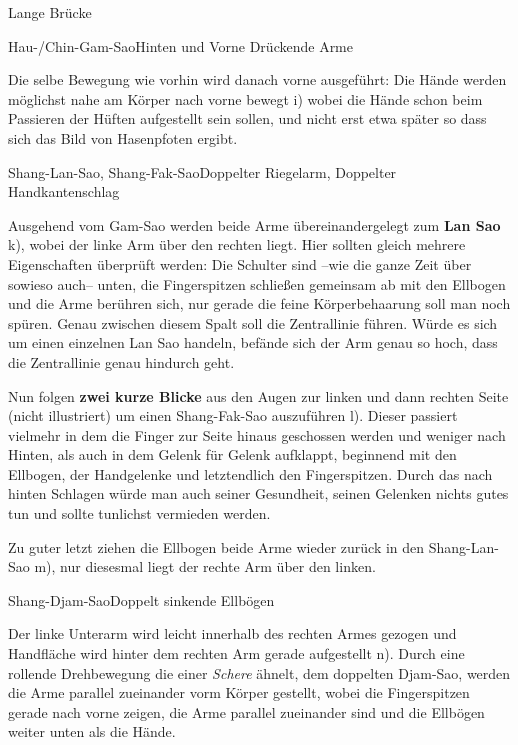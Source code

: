 \begin{WTSatz}{Lange Br\"ucke}
\begin{WTSatzTeil}{Hau-/Chin-Gam-Sao}{Hinten und Vorne Dr\"uckende Arme}
		
		Die selbe Bewegung wie vorhin wird danach vorne ausgef\"uhrt: Die H\"ande werden m\"oglichst nahe am K\"orper nach vorne bewegt i) wobei die H\"ande schon beim Passieren der H\"uften aufgestellt sein sollen, und nicht erst etwa sp\"ater so dass sich das Bild von Hasenpfoten ergibt.
		
	\end{WTSatzTeil}
	\begin{WTSatzTeil}{Shang-Lan-Sao, Shang-Fak-Sao}{Doppelter Riegelarm, Doppelter Handkantenschlag}
		
		Ausgehend vom Gam-Sao werden beide Arme \"ubereinandergelegt zum \textbf{Lan Sao} k), wobei der linke Arm \"uber den rechten liegt. Hier sollten gleich mehrere Eigenschaften \"uberpr\"uft werden: Die Schulter sind --wie die ganze Zeit \"uber sowieso auch-- unten, die Fingerspitzen schlie{\ss}en gemeinsam ab mit den Ellbogen und die Arme ber\"uhren sich, nur gerade die feine K\"orperbehaarung soll man noch sp\"uren. Genau zwischen diesem Spalt soll die Zentrallinie f\"uhren. W\"urde es sich um einen einzelnen Lan Sao handeln, bef\"ande sich der Arm genau so hoch, dass die Zentrallinie genau hindurch geht.
		
		
		Nun folgen \textbf{zwei kurze Blicke} aus den Augen zur linken und dann rechten Seite (nicht illustriert) um einen Shang-Fak-Sao auszuf\"uhren l). Dieser passiert vielmehr in dem die Finger zur Seite hinaus geschossen werden und weniger nach Hinten, als auch in dem Gelenk f\"ur Gelenk aufklappt, beginnend mit den Ellbogen, der Handgelenke und letztendlich den Fingerspitzen. Durch das nach hinten Schlagen w\"urde man auch seiner Gesundheit, seinen Gelenken nichts gutes tun und sollte tunlichst vermieden werden.
		
		Zu guter letzt ziehen die Ellbogen beide Arme wieder zur\"uck in den Shang-Lan-Sao m), nur diesesmal liegt der rechte Arm \"uber den linken.
		
	\end{WTSatzTeil}
	\begin{WTSatzTeil}{Shang-Djam-Sao}{Doppelt sinkende Ellb\"ogen}
		
		Der linke Unterarm wird leicht innerhalb des rechten Armes gezogen und Handfl\"ache wird hinter dem rechten Arm gerade aufgestellt n). Durch eine rollende Drehbewegung die einer \textit{Schere} \"ahnelt, dem doppelten Djam-Sao, werden die Arme parallel zueinander vorm K\"orper gestellt, wobei die Fingerspitzen gerade nach vorne zeigen, die Arme parallel zueinander sind und die Ellb\"ogen weiter unten als die H\"ande.
		

\end{WTSatzTeil}
\end{WTSatz}
